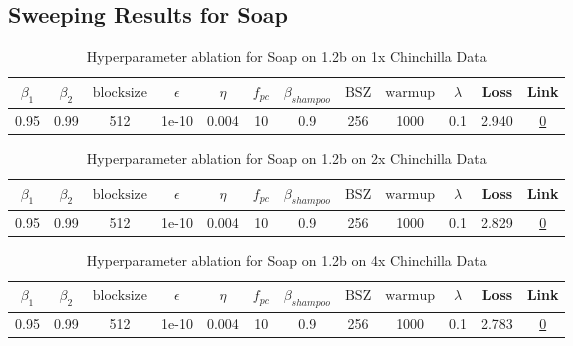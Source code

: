 \subsection{Sweeping Results for Soap}%
\begin{table}[H]
\centering
\caption{Hyperparameter ablation for Soap on 1.2b on 1x Chinchilla Data}
\label{tab:ablation_soap_1.2b_1}
\begin{tabular}{cccccccccccc}
\toprule
$\beta_1$ & $\beta_2$ & $\mathrm{block size}$ & $\epsilon$ & $\eta$ & $f_{pc}$ & $\beta_{shampoo}$ & $\mathrm{BSZ}$ & $\mathrm{warmup}$ & $\lambda$ & Loss & Link \\
\midrule
0.95 & 0.99 & 512 & 1e-10 & 0.004 & 10 & 0.9 & 256 & 1000 & 0.1 & 2.940 & \href{https://wandb.ai/stanford-mercury/optimizer-scaling/runs/sweep-1.2b-24B-soapebf16d04f58lr0.004-wd0.1-minlr0.0-warmup1000--82b8d3}{0} \\
\midrule
\bottomrule
\end{tabular}
\end{table}

\begin{table}[H]
\centering
\caption{Hyperparameter ablation for Soap on 1.2b on 2x Chinchilla Data}
\label{tab:ablation_soap_1.2b_2}
\begin{tabular}{cccccccccccc}
\toprule
$\beta_1$ & $\beta_2$ & $\mathrm{block size}$ & $\epsilon$ & $\eta$ & $f_{pc}$ & $\beta_{shampoo}$ & $\mathrm{BSZ}$ & $\mathrm{warmup}$ & $\lambda$ & Loss & Link \\
\midrule
0.95 & 0.99 & 512 & 1e-10 & 0.004 & 10 & 0.9 & 256 & 1000 & 0.1 & 2.829 & \href{https://wandb.ai/stanford-mercury/optimizer-scaling/runs/sweep-1.2b-48B-soapeweightf32ae127elr0.004-wd0.1-minlr0.0-warmup-000547}{0} \\
\midrule
\bottomrule
\end{tabular}
\end{table}

\begin{table}[H]
\centering
\caption{Hyperparameter ablation for Soap on 1.2b on 4x Chinchilla Data}
\label{tab:ablation_soap_1.2b_4}
\begin{tabular}{cccccccccccc}
\toprule
$\beta_1$ & $\beta_2$ & $\mathrm{block size}$ & $\epsilon$ & $\eta$ & $f_{pc}$ & $\beta_{shampoo}$ & $\mathrm{BSZ}$ & $\mathrm{warmup}$ & $\lambda$ & Loss & Link \\
\midrule
0.95 & 0.99 & 512 & 1e-10 & 0.004 & 10 & 0.9 & 256 & 1000 & 0.1 & 2.783 & \href{https://wandb.ai/stanford-mercury/optimizer-scaling/runs/sweep-1.2b-96B-soapeweightf321bf579lr0.004-wd0.1-minlr0.0-warmup-7fd4b6}{0} \\
\midrule
\bottomrule
\end{tabular}
\end{table}

